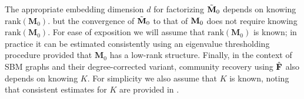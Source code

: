 \documentclass[10pt,journal,compsoc]{IEEEtran}
\newcommand{\ee}{\end{aligned} \end{equation}}
\newcommand{\bds}{\boldsymbol}
\newcommand{\tp}{^\top}
\newcommand{\bee}{\begin{equation}\begin{aligned}}
\newcommand{\M}[1]{{{\mathbf{\MakeUppercase{#1}}}}}
\numberwithin{equation}{section}
\begin{document}
{\remark\label{rk:dcsbm}
  {\upshape The appropriate embedding
  dimension $d$ for factorizing $\tilde{\M M}_0$ depends on knowing
  $\mathrm{rank}(\mathbf{M}_0)$.
  but the convergence of
  $\tilde{\M M}_0$ to that of ${\M M}_0$ does not require knowing $\mathrm{rank}(\mathbf{M}_0)$. For ease of exposition we will assume that
  $\mathrm{rank}(\mathbf{M}_0)$ is known; in practice it can be estimated consistently using an eigenvalue
  thresholding procedure provided that $\mathbf{M}_0$ has a low-rank
  structure. Finally, in the context of SBM graphs 
  and their degree-corrected variant, community recovery using $\hat{\M F}$ also depends on knowing $K$. For
  simplicity we also assume that $K$ is known, noting that consistent
  estimates for $K$
  are provided in \cite{bickel13:_hypot,lei2014}.}
}%





\end{document}
